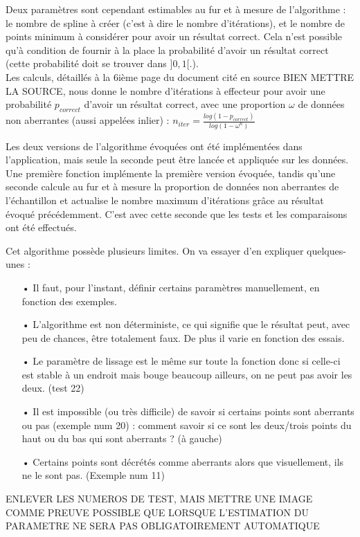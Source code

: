 \documentclass[a4paper,12pt]{article} %
\begin{document}
                    Deux paramètres sont cependant estimables au fur et à mesure de l'algorithme :\\ le nombre de spline à créer (c'est à dire le nombre d'itérations), et le nombre de points minimum à considérer pour avoir un résultat correct. Cela n'est possible qu'à condition de fournir à la place la probabilité d'avoir un résultat correct (cette probabilité doit se trouver dans $]0,1[$.). \\
                    Les calculs, détaillés à la 6ième page du document cité en source BIEN METTRE LA SOURCE, nous donne le nombre d'itérations à effecteur pour avoir une probabilité $p_{correct}$ d'avoir un résultat correct, avec une proportion $\omega$ de données non aberrantes (aussi appelées inlier) : $n_{iter} = \frac{log(1 - p_{correct})}{log(1 - \omega^n)}$
                    
                    Les deux versions de l'algorithme évoquées ont été implémentées dans l'application, mais seule la seconde peut être lancée et appliquée sur les données.
                    Une première fonction implémente la première version évoquée, tandis qu'une seconde calcule au fur et à mesure la proportion de données non aberrantes de l'échantillon et actualise le nombre maximum d'itérations grâce au résultat évoqué précédemment.
                    C'est avec cette seconde que les tests et les comparaisons ont été effectués.
                    
                    Cet algorithme possède plusieurs limites. On va essayer d'en expliquer quelques-unes :
                    \begin{itemize}
                    \item[•] Il faut, pour l'instant, définir certains paramètres manuellement, en fonction des exemples.
                    \item[•] L'algorithme est non déterministe, ce qui signifie que le résultat peut, avec peu de chances, être totalement faux. De plus il varie en fonction des essais.
                    \item[•] Le paramètre de lissage est le même sur toute la fonction donc si celle-ci est stable à un endroit mais bouge beaucoup ailleurs, on ne peut pas avoir les deux. (test 22)
                    \item[•] Il est impossible (ou très difficile) de savoir si certains points sont aberrants ou pas (exemple num 20) : comment savoir si ce sont les deux/trois points du haut ou du bas qui sont aberrants ? (à gauche)
                    \item[•] Certains points sont décrétés comme aberrants alors que visuellement, ils ne le sont pas. (Exemple num 11)\\
                    \end{itemize}
                    ENLEVER LES NUMEROS DE TEST, MAIS METTRE UNE IMAGE COMME PREUVE
                   POSSIBLE QUE LORSQUE L'ESTIMATION DU PARAMETRE NE SERA PAS OBLIGATOIREMENT AUTOMATIQUE
                    
\end{document}

